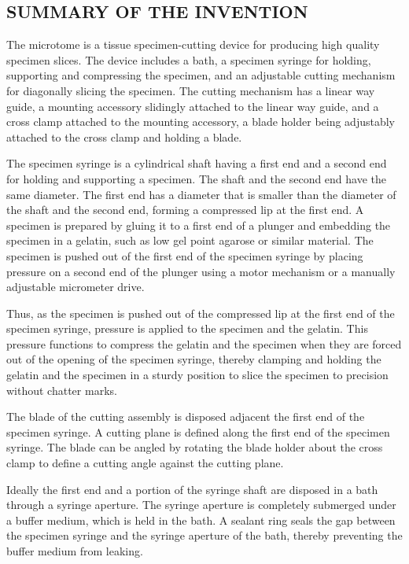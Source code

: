 \documentclass{article}
\begin{document}
\subsection*{SUMMARY OF THE INVENTION}

The microtome is a tissue specimen-cutting device for producing high quality specimen slices. The device includes a bath, a specimen syringe for holding, supporting and compressing the specimen, and an adjustable cutting mechanism for diagonally slicing the specimen. The cutting mechanism has a linear way guide, a mounting accessory slidingly attached to the linear way guide, and a cross clamp attached to the mounting accessory, a blade holder being adjustably attached to the cross clamp and holding a blade.

The specimen syringe is a cylindrical shaft having a first end and a second end for holding and supporting a specimen. The shaft and the second end have the same diameter. The first end has a diameter that is smaller than the diameter of the shaft and the second end, forming a compressed lip at the first end. A specimen is prepared by gluing it to a first end of a plunger and embedding the specimen in a gelatin, such as low gel point agarose or similar material. The specimen is pushed out of the first end of the specimen syringe by placing pressure on a second end of the plunger using a motor mechanism or a manually adjustable micrometer drive.

Thus, as the specimen is pushed out of the compressed lip at the first end of the specimen syringe, pressure is applied to the specimen and the gelatin. This pressure functions to compress the gelatin and the specimen when they are forced out of the opening of the specimen syringe, thereby clamping and holding the gelatin and the specimen in a sturdy position to slice the specimen to precision without chatter marks.

The blade of the cutting assembly is disposed adjacent the first end of the specimen syringe. A cutting plane is defined along the first end of the specimen syringe. The blade can be angled by rotating the blade holder about the cross clamp to define a cutting angle against the cutting plane.

Ideally the first end and a portion of the syringe shaft are disposed in a bath through a syringe aperture. The syringe aperture is completely submerged under a buffer medium, which is held in the bath. A sealant ring seals the gap between the specimen syringe and the syringe aperture of the bath, thereby preventing the buffer medium from leaking.
\end{document}
